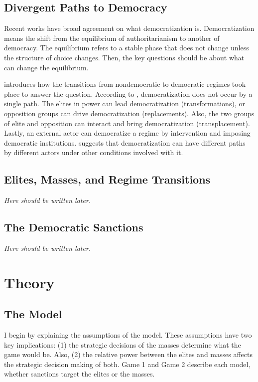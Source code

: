 \documentclass[11pt]{article}
\begin{document}
\subsection*{Divergent Paths to Democracy}

Recent works have broad agreement on what democratization is. Democratization means the shift from the equilibrium of authoritarianism to another of democracy. The equilibrium refers to a stable phase that does not change unless the structure of choice changes. Then, the key questions should be about what can change the equilibrium. 

\citet{Huntington1993} introduces how the transitions from nondemocratic to democratic regimes took place to answer the question. According to \citet{Huntington1993}, democratization does not occur by a single path. The elites in power can lead democratization (transformations), or opposition groups can drive democratization (replacements). Also, the two groups of elite and opposition can interact and bring democratization (transplacement). Lastly, an external actor can democratize a regime by intervention and imposing democratic institutions. \citet{Huntington1993} suggests that democratization can have different paths by different actors under other conditions involved with it. 

\subsection*{Elites, Masses, and Regime Transitions}
\textit{Here should be written later.}

\subsection*{The Democratic Sanctions}
\textit{Here should be written later.}

\section*{Theory}
\subsection*{The Model}
I begin by explaining the assumptions of the model. These assumptions have two key implications: (1) the strategic decisions of the masses determine what the game would be. Also, (2) the relative power between the elites and masses affects the strategic decision making of both. Game 1 and Game 2 describe each model, whether sanctions target the elites or the masses.
	
\end{document}
